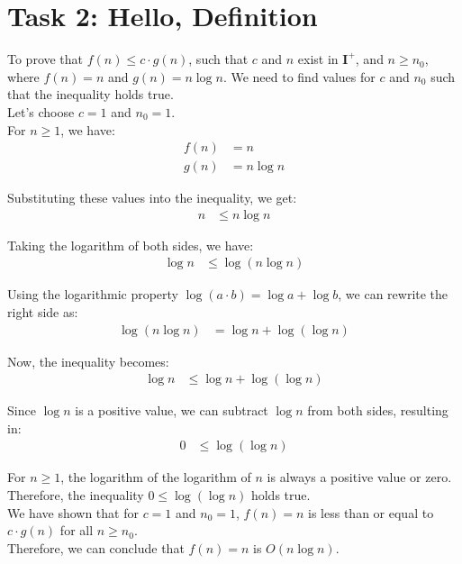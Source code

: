  \chapter{Task 2: Hello, Definition}

To prove that $f(n) \leq c \cdot g(n)$, such that $c$ and $n$ exist in $\mathbf{I}^+$, and $n \geq n_0$, where $f(n) = n$ and $g(n) = n \log n$.
We need to find values for $c$ and $n_0$ such that the inequality holds true.\\

Let's choose $c = 1$ and $n_0 = 1$.\\

For $n \geq 1$, we have: 
\begin{align*}
f(n) &= n \\
g(n) &= n \log n
\end{align*}

Substituting these values into the inequality, we get:
\begin{align*}
n &\leq n \log n
\end{align*}

Taking the logarithm of both sides, we have:
\begin{align*}
\log n &\leq \log(n \log n)
\end{align*}

Using the logarithmic property $\log(a \cdot b) = \log a + \log b$, we can rewrite the right side as:
\begin{align*}
\log(n \log n) &= \log n + \log(\log n)
\end{align*}

Now, the inequality becomes:
\begin{align*}
\log n &\leq \log n + \log(\log n)
\end{align*}

Since $\log n$ is a positive value, we can subtract $\log n$ from both sides, resulting in:
\begin{align*}
0 &\leq \log(\log n)
\end{align*}

For $n \geq 1$, the logarithm of the logarithm of $n$ is always a positive value or zero. Therefore, the inequality $0 \leq \log(\log n)$ holds true.\\

We have shown that for $c = 1$ and $n_0 = 1$, $f(n) = n$ is less than or equal to $c \cdot g(n)$ for all $n \geq n_0$.\\

Therefore, we can conclude that $f(n) = n$ is $O(n \log n)$.







